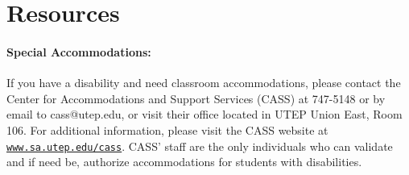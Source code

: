 \documentclass[12pt]{scrartcl}
\begin{document}
%
%
%


\section{Resources}

\paragraph{Special Accommodations: }
If you have a disability and need classroom accommodations, please contact the Center for Accommodations and Support Services (CASS) at 747-5148 or by email to cass@utep.edu, or visit their office located in UTEP Union East, Room 106. For additional information, please visit the CASS website at \href{http://www.sa.utep.edu/cass}{\texttt{www.sa.utep.edu/cass}}. CASS’ staff are the only individuals who can validate and if need be, authorize accommodations for students with disabilities.
\end{document}
